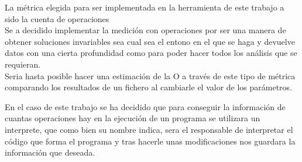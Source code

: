 La métrica elegida para ser implementada en la herramienta de este trabajo a sido la cuenta de operaciones\\
 
Se a decidido implementar la medición con operaciones por ser una manera de obtener soluciones invariables sea cual sea el entono en el que se haga y devuelve datos con una cierta profundidad como para poder hacer todos los análisis que se requieran. \\

Seria hasta posible hacer una estimación de la O a través de este tipo de métrica comparando los resultados de un fichero al cambiarle el valor de los parámetros.

En el caso de este trabajo se ha decidido que para conseguir la información de cuantas operaciones hay en la ejecución de un programa se utilizara un interprete, que como bien su nombre indica, sera el responsable de interpretar el código que forma el programa y tras hacerle unas modificaciones nos guardara  la información que deseada. 



